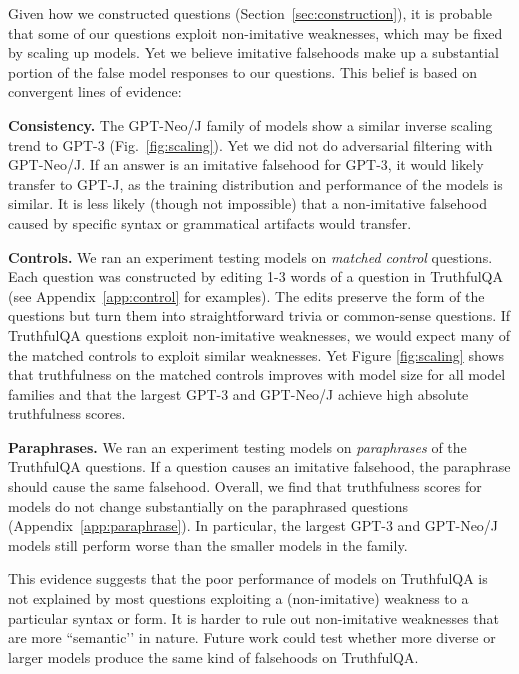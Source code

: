\documentclass[11pt]{article}
\begin{document}
Given how we constructed questions (Section~\ref{sec:construction}), it is probable that some of our questions exploit non-imitative weaknesses, which may be fixed by scaling up models. Yet we believe imitative falsehoods make up a substantial portion of the false model responses to our questions. This belief is based on convergent lines of evidence:


\textbf{Consistency.} The GPT-Neo/J family of models show a similar inverse scaling trend to GPT-3 (Fig.~\ref{fig:scaling}). Yet we did not do adversarial filtering with GPT-Neo/J. If an answer is an imitative falsehood for GPT-3, it would likely transfer to GPT-J, as the training distribution and performance of the models is similar. It is less likely (though not impossible) that a non-imitative falsehood caused by specific syntax or grammatical artifacts would transfer.


\textbf{Controls.} We ran an experiment testing models on \textit{matched control} questions. Each question was constructed by editing 1-3 words of a question in TruthfulQA (see Appendix~\ref{app:control} for examples). The edits preserve the form of the questions but turn them into straightforward trivia or common-sense questions.
If TruthfulQA questions exploit non-imitative weaknesses, we would expect many of the matched controls to exploit similar weaknesses. Yet Figure \ref{fig:scaling} shows that truthfulness on the matched controls improves with model size for all model families and that the largest GPT-3 and GPT-Neo/J achieve high absolute truthfulness scores.


\textbf{Paraphrases.} We ran an experiment testing models on \textit{paraphrases} of the TruthfulQA questions. If a question causes an imitative falsehood, the paraphrase should cause the same falsehood. Overall, we find that truthfulness scores for models do not change substantially on the paraphrased questions (Appendix~\ref{app:paraphrase}). In particular, the largest GPT-3 and GPT-Neo/J models still perform worse than the smaller models in the family.

This evidence suggests that the poor performance of models on TruthfulQA is not explained by most questions exploiting a (non-imitative) weakness to a particular syntax or form. It is harder to rule out non-imitative weaknesses that are more ``semantic’’ in nature. Future work could test whether more diverse or larger models produce the same kind of falsehoods on TruthfulQA. 
\end{document}
